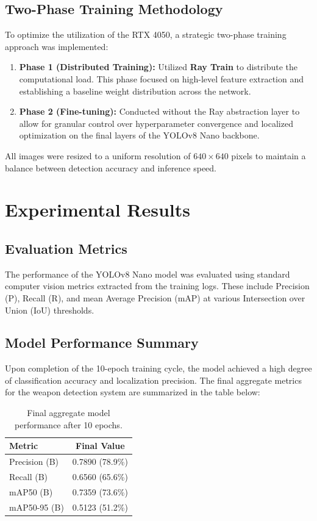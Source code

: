 \documentclass[12pt, a4paper]{report}
\begin{document}
\section{Two-Phase Training Methodology}
To optimize the utilization of the RTX 4050, a strategic two-phase training approach was implemented:
\begin{enumerate}
    \item \textbf{Phase 1 (Distributed Training):} Utilized \textbf{Ray Train} to distribute the computational load. This phase focused on high-level feature extraction and establishing a baseline weight distribution across the network.
    \item \textbf{Phase 2 (Fine-tuning):} Conducted without the Ray abstraction layer to allow for granular control over hyperparameter convergence and localized optimization on the final layers of the YOLOv8 Nano backbone.
\end{enumerate}
All images were resized to a uniform resolution of $640 \times 640$ pixels to maintain a balance between detection accuracy and inference speed.

\chapter{Experimental Results}

\section{Evaluation Metrics}
The performance of the YOLOv8 Nano model was evaluated using standard computer vision metrics extracted from the training logs.  These include Precision (P), Recall (R), and mean Average Precision (mAP) at various Intersection over Union (IoU) thresholds. 

\section{Model Performance Summary}
Upon completion of the 10-epoch training cycle, the model achieved a high degree of classification accuracy and localization precision.  The final aggregate metrics for the weapon detection system are summarized in the table below:

\begin{table}[h]
\centering
\begin{tabular}{|l|c|}
\hline
\textbf{Metric} & \textbf{Final Value} \\ \hline
Precision (B) & 0.7890 (78.9\%) \\ \hline
Recall (B) & 0.6560 (65.6\%) \\ \hline
mAP50 (B) & 0.7359 (73.6\%) \\ \hline
mAP50-95 (B) & 0.5123 (51.2\%) \\ \hline
\end{tabular}
\caption{Final aggregate model performance after 10 epochs. }
\end{table}
\end{document}
